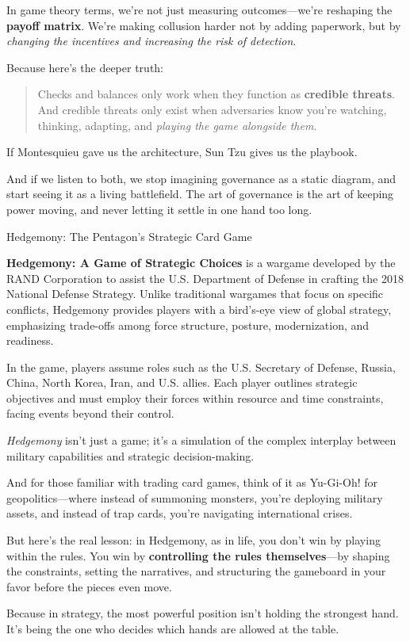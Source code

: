 In game theory terms, we’re not just measuring outcomes—we’re reshaping the \textbf{payoff matrix}. We’re making collusion harder not by adding paperwork, but by \textit{changing the incentives and increasing the risk of detection}.

Because here’s the deeper truth:

\begin{quote}
Checks and balances only work when they function as \textbf{credible threats}. And credible threats only exist when adversaries know you’re watching, thinking, adapting, and \textit{playing the game alongside them}.
\end{quote}

If Montesquieu gave us the architecture, Sun Tzu gives us the playbook.

And if we listen to both, we stop imagining governance as a static diagram, and start seeing it as a living battlefield. The art of governance is the art of keeping power moving, and never letting it settle in one hand too long.

\medskip

\begin{HistoricalSidebar}{Hedgemony: The Pentagon’s Strategic Card Game}

  \textbf{Hedgemony: A Game of Strategic Choices} is a wargame developed by the RAND Corporation to assist the U.S. Department of Defense in crafting the 2018 National Defense Strategy. Unlike traditional wargames that focus on specific conflicts, Hedgemony provides players with a bird's-eye view of global strategy, emphasizing trade-offs among force structure, posture, modernization, and readiness.
  
  \medskip
  
  In the game, players assume roles such as the U.S. Secretary of Defense, Russia, China, North Korea, Iran, and U.S. allies. Each player outlines strategic objectives and must employ their forces within resource and time constraints, facing events beyond their control.
  
  \medskip
  
  \textit{Hedgemony} isn’t just a game; it’s a simulation of the complex interplay between military capabilities and strategic decision-making.
  
  \medskip
  
  And for those familiar with trading card games, think of it as Yu-Gi-Oh! for geopolitics—where instead of summoning monsters, you’re deploying military assets, and instead of trap cards, you’re navigating international crises.
  
  \medskip
  
  But here’s the real lesson: in Hedgemony, as in life, you don’t win by playing within the rules.  
  You win by \textbf{controlling the rules themselves}—by shaping the constraints, setting the narratives, and structuring the gameboard in your favor before the pieces even move.
  
  \medskip
  
  Because in strategy, the most powerful position isn’t holding the strongest hand.  
  It’s being the one who decides which hands are allowed at the table.
    
\end{HistoricalSidebar}
  